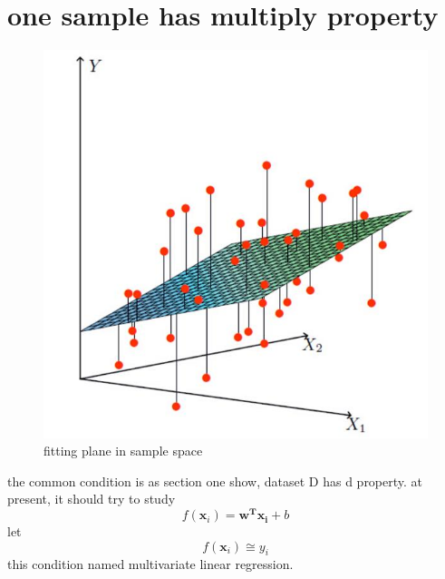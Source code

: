 \documentclass[12pt]{ctexart}%
\begin{document}
	\section{\quad one sample has multiply property}
		\begin{figure}[H]
			\centering
			\includegraphics[scale=0.5]{fitting_plane.jpg}
			\renewcommand{\figurename}{Fig} %
			\caption{fitting plane in sample space}
			\label{fig:1}
		\end{figure}
		the common condition is as section one show, dataset D has d property. at present, it should try to study 
		\begin{equation}f(\boldsymbol x_i) = \boldsymbol{w^{T}}\boldsymbol{x_{i}} + b\end{equation}
		\qquad let \begin{equation}f(\boldsymbol x_i)\cong{y_i}\end{equation}
		\qquad this condition named multivariate linear regression.
\end{document}
